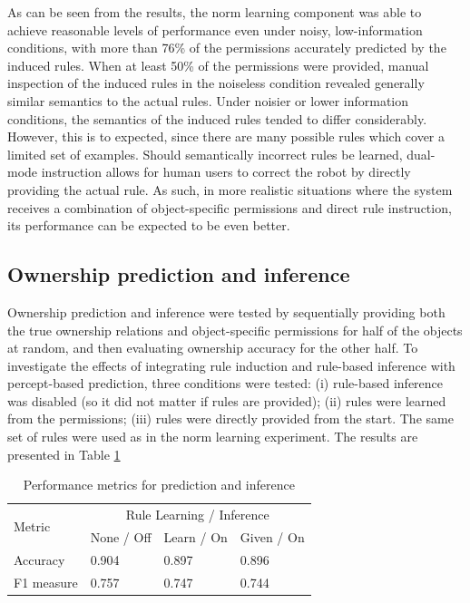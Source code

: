\documentclass[letterpaper]{article} %
\begin{document}
As can be seen from the results, the norm learning component was able to achieve reasonable levels of performance even under noisy, low-information conditions, with more than 76\% of the permissions accurately predicted by the induced rules. When at least 50\% of the permissions were provided, manual inspection of the induced rules in the noiseless condition revealed generally similar semantics to the actual rules. Under noisier or lower information conditions, the semantics of the induced rules tended to differ considerably. However, this is to expected, since there are many possible rules which cover a limited set of examples. Should semantically incorrect rules be learned, dual-mode instruction allows for human users to correct the robot by directly providing the actual rule. As such, in more realistic situations where the system receives a combination of object-specific permissions and direct rule instruction, its performance can be expected to be even better.

\subsection{Ownership prediction and inference}

Ownership prediction and inference were tested by sequentially providing both the true ownership relations and object-specific permissions for half of the objects at random, and then evaluating ownership accuracy for the other half. To investigate the effects of integrating rule induction and rule-based inference with percept-based prediction, three conditions were tested: (i) rule-based inference was disabled (so it did not matter if rules are provided); (ii) rules were learned from the permissions; (iii) rules were directly provided from the start. The same set of rules were used as in the norm learning experiment. The results are presented in Table \ref{tab:OwnershipPrediction}

\begin{table}[ht]
\centering
\begin{tabular}{@{}llll@{}}
\toprule
\multirow{2}{*}{Metric} & \multicolumn{3}{c}{Rule Learning / Inference} \\ \cmidrule(l){2-4}
                        & None / Off  & Learn / On & Given / On \\ \midrule
Accuracy                & 0.904       & 0.897      & 0.896      \\
F1 measure              & 0.757       & 0.747      & 0.744      \\ \bottomrule
\end{tabular}
\caption{Performance metrics for prediction and inference}
\label{tab:OwnershipPrediction}
\end{table}
\end{document}
